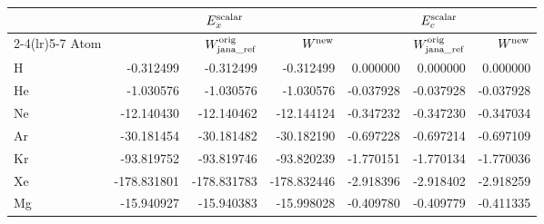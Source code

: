 \begin{tabular}{@{}l rrr rrr@{}}
\toprule
 & \multicolumn{3}{c}{$E_x^{\rm scalar}$} & \multicolumn{3}{c}{$E_c^{\rm scalar}$} \\
\cmidrule(lr){2-4}\cmidrule(lr){5-7}
Atom & \janaref{} & $W^{\rm orig}_{\rm jana\_ref}$ & $W^{\rm new}$ & \janaref{} & $W^{\rm orig}_{\rm jana\_ref}$ & $W^{\rm new}$ \\
\midrule
H & -0.312499 & \textcolor{pyscfred}{-0.312499} & \textcolor{pyscfred}{-0.312499} & 0.000000 & \textcolor{pyscfred}{0.000000} & \textcolor{pyscfred}{0.000000} \\
He & -1.030576 & \textcolor{pyscfred}{-1.030576} & \textcolor{pyscfred}{-1.030576} & -0.037928 & \textcolor{pyscfred}{-0.037928} & \textcolor{pyscfred}{-0.037928} \\
Ne & -12.140430 & \textcolor{pyscfred}{-12.140462} & \textcolor{pyscfred}{-12.144124} & -0.347232 & \textcolor{pyscfred}{-0.347230} & \textcolor{pyscfred}{-0.347034} \\
Ar & -30.181454 & \textcolor{pyscfred}{-30.181482} & \textcolor{pyscfred}{-30.182190} & -0.697228 & \textcolor{pyscfred}{-0.697214} & \textcolor{pyscfred}{-0.697109} \\
Kr & -93.819752 & \textcolor{pyscfred}{-93.819746} & \textcolor{pyscfred}{-93.820239} & -1.770151 & \textcolor{pyscfred}{-1.770134} & \textcolor{pyscfred}{-1.770036} \\
Xe & -178.831801 & \textcolor{pyscfred}{-178.831783} & \textcolor{pyscfred}{-178.832446} & -2.918396 & \textcolor{pyscfred}{-2.918402} & \textcolor{pyscfred}{-2.918259} \\
Mg & -15.940927 & \textcolor{pyscfred}{-15.940383} & \textcolor{pyscfred}{-15.998028} & -0.409780 & \textcolor{pyscfred}{-0.409779} & \textcolor{pyscfred}{-0.411335} \\
\bottomrule
\end{tabular}
